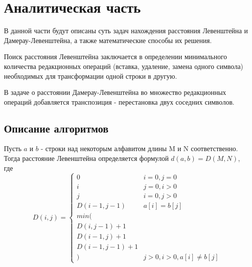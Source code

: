 \chapter{Аналитическая часть}
\label{cha:analysis}

В данной части будут описаны суть задач нахождения расстояния Левенштейна и Дамерау-Левенштейна, а также математические способы их решения.

Поиск расстояния Левенштейна заключается в определении минимального количества редакционных операций (вставка, удаление, замена одного символа) необходимых для трансформации одной строки в другую.

В задаче о расстоянии Дамерау-Левенштейна во множество редакционных операций добавляется транспозиция - перестановка двух соседних символов.

\section{Описание алгоритмов}

Пусть $a$ и $b$ - строки над некоторым алфавитом длины M и N соответственно. Тогда расстояние Левенштейна определяется формулой $d(a, b) = D(M, N)$, где
\begin{equation*}
    D(i, j) =
    \begin{cases}
        0 & i=0, j=0\\
        i & j=0, i>0\\
        j & i=0, j>0\\
        D(i-1, j-1) & a[i]=b[j]\\
        min(\\
            D(i, j-1) + 1\\
            D(i-1, j) + 1\\
            D(i-1, j-1) + 1\\
        ) & j>0, i>0, a[i] \ne b[j]
    \end{cases}
\end{equation*}

